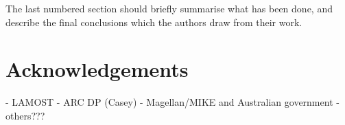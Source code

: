 \documentclass[a4paper,fleqn,usenatbib]{mnras}
\begin{document}
The last numbered section should briefly summarise what has been done, and describe
the final conclusions which the authors draw from their work.

\section*{Acknowledgements}

- LAMOST
- ARC DP (Casey)
- Magellan/MIKE and Australian government
- others???











\appendix
\end{document}
